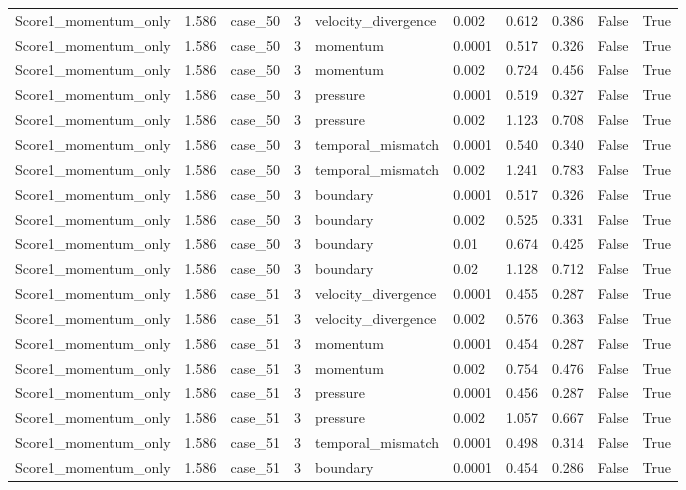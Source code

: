 \begin{longtable}{llllllllll}
Score1\_momentum\_only & 1.586 & case\_50 & 3 & velocity\_divergence & 0.002 & 0.612 & 0.386 & False & True \\
Score1\_momentum\_only & 1.586 & case\_50 & 3 & momentum & 0.0001 & 0.517 & 0.326 & False & True \\
Score1\_momentum\_only & 1.586 & case\_50 & 3 & momentum & 0.002 & 0.724 & 0.456 & False & True \\
Score1\_momentum\_only & 1.586 & case\_50 & 3 & pressure & 0.0001 & 0.519 & 0.327 & False & True \\
Score1\_momentum\_only & 1.586 & case\_50 & 3 & pressure & 0.002 & 1.123 & 0.708 & False & True \\
Score1\_momentum\_only & 1.586 & case\_50 & 3 & temporal\_mismatch & 0.0001 & 0.540 & 0.340 & False & True \\
Score1\_momentum\_only & 1.586 & case\_50 & 3 & temporal\_mismatch & 0.002 & 1.241 & 0.783 & False & True \\
Score1\_momentum\_only & 1.586 & case\_50 & 3 & boundary & 0.0001 & 0.517 & 0.326 & False & True \\
Score1\_momentum\_only & 1.586 & case\_50 & 3 & boundary & 0.002 & 0.525 & 0.331 & False & True \\
Score1\_momentum\_only & 1.586 & case\_50 & 3 & boundary & 0.01 & 0.674 & 0.425 & False & True \\
Score1\_momentum\_only & 1.586 & case\_50 & 3 & boundary & 0.02 & 1.128 & 0.712 & False & True \\
Score1\_momentum\_only & 1.586 & case\_51 & 3 & velocity\_divergence & 0.0001 & 0.455 & 0.287 & False & True \\
Score1\_momentum\_only & 1.586 & case\_51 & 3 & velocity\_divergence & 0.002 & 0.576 & 0.363 & False & True \\
Score1\_momentum\_only & 1.586 & case\_51 & 3 & momentum & 0.0001 & 0.454 & 0.287 & False & True \\
Score1\_momentum\_only & 1.586 & case\_51 & 3 & momentum & 0.002 & 0.754 & 0.476 & False & True \\
Score1\_momentum\_only & 1.586 & case\_51 & 3 & pressure & 0.0001 & 0.456 & 0.287 & False & True \\
Score1\_momentum\_only & 1.586 & case\_51 & 3 & pressure & 0.002 & 1.057 & 0.667 & False & True \\
Score1\_momentum\_only & 1.586 & case\_51 & 3 & temporal\_mismatch & 0.0001 & 0.498 & 0.314 & False & True \\
Score1\_momentum\_only & 1.586 & case\_51 & 3 & boundary & 0.0001 & 0.454 & 0.286 & False & True \\

\end{longtable}
